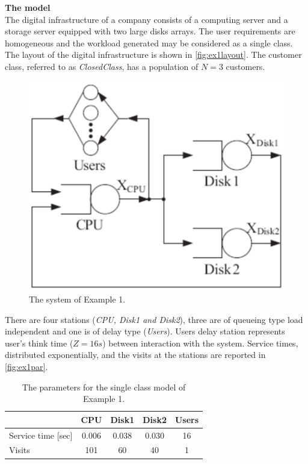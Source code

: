 \noindent \textbf{The model}\\
The digital infrastructure of a company consists of a computing
server and a storage server equipped with two large disks arrays.
The user requirements are homogeneous and the workload generated
may be considered as a single class. The layout of the digital
infrastructure is shown in \autoref{fig:ex1layout}. The customer
class, referred to as \emph{ClosedClass}, has a population of
$N=3$ customers.
\begin{figure}[htb]
    \begin{center}
        \includegraphics[scale=.5]{img/jsimg/12.1.eps}
    \end{center}
    \caption{The system of Example 1.}
    \label{fig:ex1layout}
\end{figure}
There are four stations (\emph{CPU, Disk1 and Disk2}), three are
of queueing type load independent and one is of delay type
(\emph{Users}). Users delay station represents user's think time
($Z=16s$) between interaction with the system. Service times,
distributed exponentially, and the visits at the stations are
reported in \autoref{fig:ex1par}.\\

\begin{table}
\begin{center}
  \begin{tabular}{|l|c|c|c|c|}
\hline
     &CPU  &Disk1  &Disk2&Users  \\ \hline
    Service time [sec] &0.006  &0.038  &0.030&16  \\ \hline
    Visits &101  &60  &40&1  \\ \hline
      \end{tabular}\\
\end{center}
 \caption{The parameters for the single class model of Example 1.}
 \label{fig:ex1par}
\end{table}

